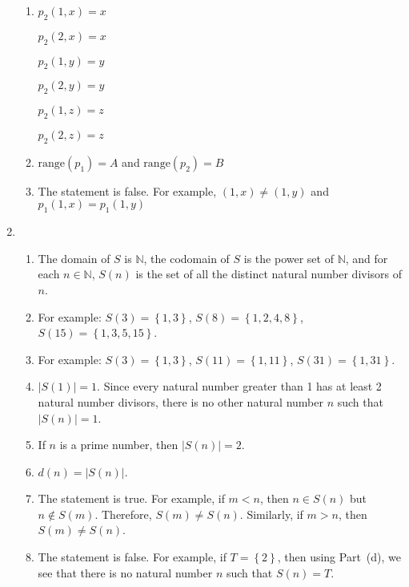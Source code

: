 \begin{enumerate}
\begin{enumerate}
\item
\begin{multicols}{3}
$p_2 ( 1, x ) = x$

$p_2 ( 2, x ) = x$

$p_2 ( 1, y ) = y$

$p_2 ( 2, y ) = y$

$p_2 ( 1, z ) = z$

$p_2 ( 2, z ) = z$
\end{multicols}
\item $\text{range} ( p_1 ) = A$ and $\text{range} ( p_2 ) = B$

\item The statement is false.  For example, $ ( 1, x ) \ne ( 1, y )$ and \\
$p_1 ( 1, x ) = p_1 ( 1, y )$
\end{enumerate}

\item \begin{enumerate}
\item The domain of $S$ is $\mathbb{N}$, the codomain of $S$ is the power set of $\mathbb{N}$, and for each $n \in \mathbb{N}$, $S ( n )$ is the set of all the distinct natural number divisors of $n$.

\item For example:  $S( 3 ) = \left\{ {1, 3} \right\}$, 
$S( 8 ) = \left\{ {1, 2, 4, 8} \right\}$, \\
$S( {15} ) = \left\{ {1, 3, 5, 15} \right\}$.

\item For example:  $S( 3 ) = \left\{ {1, 3} \right\}$, 
$S( 11 ) = \left\{ {1,11} \right\}$, 
$S( 31 ) = \left\{ {1, 31} \right\}$.

\item $\left| S ( 1 ) \right| = 1$.  Since every natural number greater than 1 has at least 2 natural number divisors, there is no other natural number $n$ such that 
$\left| S ( n ) \right| = 1$.

\item If $n$ is a prime number, then $\left| S ( n ) \right| = 2$.

\item $d ( n ) = \left| S ( n ) \right|$.

\item The statement is true.  For example, if $m < n$, then $n \in S ( n )$ but 
$n \notin S ( m )$.  Therefore, $S ( m ) \ne S ( n )$.  Similarly, if $m > n$, then $S ( m ) \ne S ( n )$.

\item The statement is false.  For example, if $T = \left\{ 2 \right\}$, then using Part~(d), we see that there is no natural number $n$ such that $S ( n ) = T$.
\end{enumerate}


\end{enumerate}
